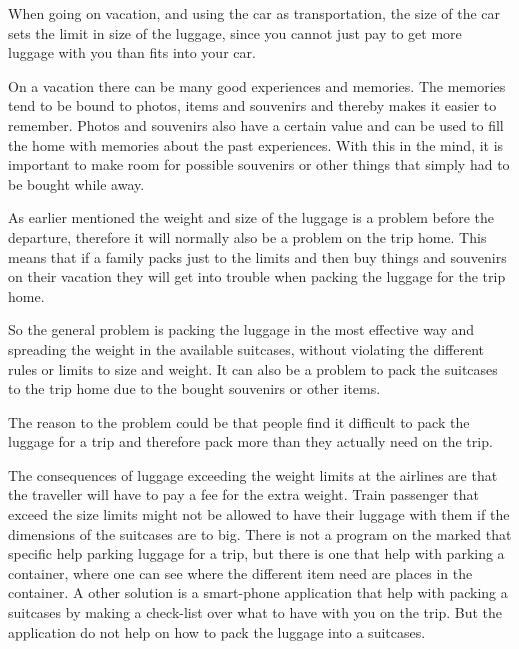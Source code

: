 When going on vacation, and using the car as transportation, the size of the car sets the limit in size of the luggage, since you cannot just pay to get more luggage with you than fits into your car. %

On a vacation there can be many good experiences and memories. The memories tend to be bound to photos, items and souvenirs and thereby makes it easier to remember. Photos and souvenirs also have a certain value and can be used to fill the home with memories about the past experiences.
With this in the mind, it is important to make room for possible souvenirs or other things that simply had to be bought while away.

As earlier mentioned the weight and size of the luggage is a problem before the departure, therefore it will normally also be a problem on the trip home.
This means that if a family packs just to the limits and then buy things and souvenirs on their vacation they will get into trouble when packing the luggage for the trip home.

So the general problem is packing the luggage in the most effective way and spreading the weight in the available suitcases, without violating the different rules or limits to size and weight. It can also be a problem to pack the suitcases to the trip home due to the bought souvenirs or other items.


The reason to the problem could be that people find it difficult to pack the luggage for a trip and therefore pack more than they actually need on the trip.

The consequences of luggage exceeding the weight limits at the airlines are that the traveller will have to pay a fee for the extra weight.
Train passenger that exceed the size limits might not be allowed to have their luggage with them if the dimensions of the suitcases are to big.
There is not a program on the marked that specific help parking luggage for a trip, but there is one that help with parking a container\citep{solvingmaze}, where one can see where the different item need are places in the container. A other solution is a smart-phone application\citep{ipack} that help with packing a suitcases by making a check-list over what to have with you on the trip. But the application do not help on how to pack the luggage into a suitcases.